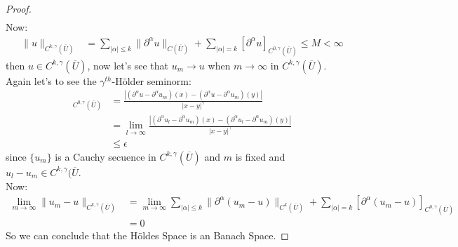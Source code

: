 \begin{proof}
\begin{align*}
  \end{align*}
  Now:
  \begin{align*}
    \|u\|_{C^{k,\gamma}(\overline{U})}&=\sum_{|\alpha|\leq k}\|\partial^{\alpha}u\|_{C(\overline{U})}+\sum_{|\alpha|=k}[\partial^{\alpha}u]_{C^{0,\gamma}(\overline{U})}\leq M<\infty
  \end{align*}
  then $u\in C^{k,\gamma}(\overline{U})$, now let's see that $u_{m}\to u$ when $m\to \infty$ in $C^{k,\gamma}(\overline{U})$.\\
  Again let's to see the $\gamma^{th}$-Hölder seminorm:  
  \begin{align*}
    [\partial^{\alpha}(u-u_m)]_{C^{0,\gamma}(\overline{U})}&=\frac{|(\partial^{\alpha}u-\partial^{\alpha}u_{m})(x)-(\partial^{\alpha}u-\partial^{\alpha}u_{m})(y)|}{|x-y|^{\gamma}}\\
    &=\lim_{l \rightarrow \infty}\frac{|(\partial^{\alpha}u_l-\partial^{\alpha}u_{m})(x)-(\partial^{\alpha}u_l-\partial^{\alpha}u_{m})(y)|}{|x-y|^{\gamma}}\\
    &\leq \epsilon
  \end{align*}
  since $\{u_m\}$ is a Cauchy secuence in $C^{k,\gamma}(\overline{U})$ and $m$ is fixed and $u_l-u_m\in C^{k,\gamma}(\overline{U}$.\\
  Now:
  \begin{align*}
    \lim_{m \rightarrow \infty}\|u_m-u\|_{C^{k,\gamma}(\overline{U})}&=\lim_{m \rightarrow \infty}\sum_{|\alpha|\leq k}\|\partial^{\alpha}(u_m-u)\|_{C^{k}(\overline{U})}+\sum_{|\alpha|=k}[\partial^{\alpha}(u_m-u)]_{C^{0,\gamma}(\overline{U})}\\
    &=0
  \end{align*}
  So we can conclude that the Höldes Space is an Banach Space.
\end{proof}

